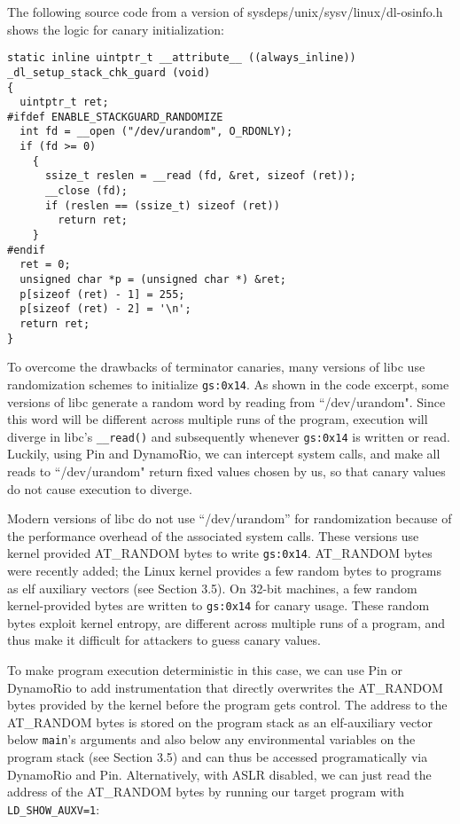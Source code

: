 The following source code from a version of sysdeps/unix/sysv/linux/dl-osinfo.h
shows the logic for canary initialization:

\begin{mylisting}
\begin{verbatim}
static inline uintptr_t __attribute__ ((always_inline))
_dl_setup_stack_chk_guard (void)
{
  uintptr_t ret;
#ifdef ENABLE_STACKGUARD_RANDOMIZE
  int fd = __open ("/dev/urandom", O_RDONLY);
  if (fd >= 0)
    {
      ssize_t reslen = __read (fd, &ret, sizeof (ret));
      __close (fd);
      if (reslen == (ssize_t) sizeof (ret))
        return ret;
    }
#endif
  ret = 0;
  unsigned char *p = (unsigned char *) &ret;
  p[sizeof (ret) - 1] = 255;
  p[sizeof (ret) - 2] = '\n';
  return ret;
}
\end{verbatim}
\end{mylisting}


To overcome the drawbacks of terminator canaries, many versions of libc use randomization schemes to
initialize \texttt{gs:0x14}.  As shown in the code excerpt, some versions of libc
generate a random word by reading from ``/dev/urandom".
Since this word will be different across multiple runs of the program,
execution will diverge in libc's \texttt{\_\_read()} and
subsequently whenever \texttt{gs:0x14} is written or read. Luckily,
using Pin and DynamoRio, we can intercept system calls,
and make all reads to ``/dev/urandom" return fixed values chosen by us,
so that canary values do not cause execution to diverge.

Modern versions of libc do not use ``/dev/urandom'' for randomization because
of the performance overhead of the associated system calls. These
versions use kernel provided AT\_RANDOM bytes to write \texttt{gs:0x14}.
AT\_RANDOM bytes were recently added; the Linux kernel provides a few random
bytes to programs as elf auxiliary vectors (see Section 3.5). On 32-bit machines,
a few random kernel-provided bytes are written to \texttt{gs:0x14} for 
canary usage. These random bytes exploit kernel entropy, are 
different across multiple runs of a program, and thus
make it difficult for attackers to guess canary values.

To make program execution deterministic in this case, we can
use Pin or DynamoRio to add instrumentation that directly
overwrites the AT\_RANDOM bytes provided by the kernel
before the program gets control. The address to the AT\_RANDOM bytes 
is stored on the program stack as an elf-auxiliary vector below
\texttt{main}'s arguments and also below any 
environmental variables on the program stack (see Section 3.5) and 
can thus be accessed programatically via DynamoRio and Pin. 
Alternatively, with ASLR disabled, we can just read the address
of the AT\_RANDOM bytes by running our target program
with \texttt{LD\_SHOW\_AUXV=1}: 

